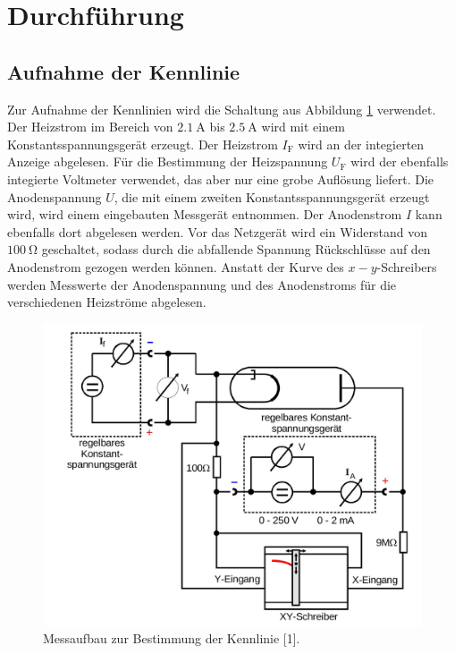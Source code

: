 \section{Durchführung}
\label{sec:Durchführung}

\subsection{Aufnahme der Kennlinie}

Zur Aufnahme der Kennlinien wird die Schaltung aus Abbildung \ref{fig:aufbau1} verwendet. Der 
Heizstrom im Bereich von $\SI{2.1}{\ampere}$ bis $\SI{2.5}{\ampere}$ wird mit einem
Konstantsspannungsgerät erzeugt. Der Heizstrom $I_\text{F}$ wird an der integierten 
Anzeige abgelesen. Für die Bestimmung der Heizspannung $U_\text{F}$ wird der ebenfalls
integierte Voltmeter verwendet, das aber nur eine grobe Auflösung liefert. Die 
Anodenspannung $U$, die mit einem zweiten Konstantsspannungsgerät erzeugt wird, wird
einem eingebauten Messgerät entnommen. Der Anodenstrom $I$ kann ebenfalls dort
abgelesen werden. Vor das Netzgerät wird ein Widerstand von $\SI{100}{\ohm}$ geschaltet,
sodass durch die abfallende Spannung Rückschlüsse auf den Anodenstrom gezogen werden 
können. Anstatt der Kurve des $x-y$-Schreibers werden Messwerte der Anodenspannung 
und des Anodenstroms für die verschiedenen Heizströme abgelesen. 

\begin{figure}
  \centering
  \includegraphics[scale=0.2]{content/Aufbau1.jpg}
  \caption{Messaufbau zur Bestimmung der Kennlinie [1].}
  \label{fig:aufbau1}
\end{figure}

